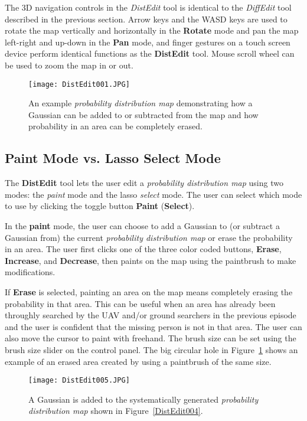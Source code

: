 The 3D navigation controls in the \textit{DistEdit} tool is identical to the \textit{DiffEdit} tool described in the previous section. Arrow keys and the WASD keys are used to rotate the map vertically and horizontally in the \textbf{Rotate} mode and pan the map left-right and up-down in the \textbf{Pan} mode, and finger gestures on a touch screen device perform identical functions as the \textbf{DistEdit} tool. Mouse scroll wheel can be used to zoom the map in or out.

\begin{figure}
\centering
\texttt{[image: DistEdit001.JPG]}
\caption{An example \textit{probability distribution map} demonstrating how a Gaussian can be added to or subtracted from the map and how probability in an area can be completely erased.}
\label{DistEdit001}
\end{figure}

\subsection{Paint Mode vs. Lasso Select Mode}

The \textbf{DistEdit} tool lets the user edit a \textit{probability distribution map} using two modes: the \textit{paint} mode and the lasso \textit{select} mode. The user can select which mode to use by clicking the toggle button \textbf{Paint} (\textbf{Select}). 

In the \textbf{paint} mode, the user can choose to add a Gaussian to (or subtract a Gaussian from) the current \textit{probability distribution map} or erase the probability in an area. The user first clicks one of the three color coded buttons, \textbf{Erase}, \textbf{Increase}, and \textbf{Decrease}, then paints on the map using the paintbrush to make modifications.

If \textbf{Erase} is selected, painting an area on the map means completely erasing the probability in that area. This can be useful when an area has already been throughly searched by the UAV and/or ground searchers in the previous episode and the user is confident that the missing person is not in that area. The user can also move the cursor to paint with freehand. The brush size can be set using the brush size slider on the control panel. The big circular hole in Figure~\ref{DistEdit001} shows an example of an erased area created by using a paintbrush of the same size.

\begin{figure}
\centering
\texttt{[image: DistEdit005.JPG]}
\caption{A Gaussian is added to the systematically generated \textit{probability distribution map} shown in Figure~\ref{DistEdit004}.}
\label{DistEdit005}
\end{figure}

